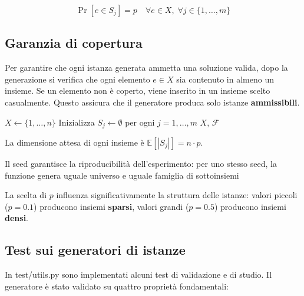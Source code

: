 \documentclass[12pt, a4paper]{article}
\begin{document}
$$\Pr[e \in S_j] = p \quad \forall e \in X, \; \forall j \in \{1, \ldots, m\}$$

\subsection*{Garanzia di copertura}

Per garantire che ogni istanza generata ammetta una soluzione valida, 
dopo la generazione si verifica che ogni elemento $e \in X$ 
sia contenuto in almeno un insieme. Se un elemento non è coperto, 
viene inserito in un insieme scelto casualmente. 
Questo assicura che il generatore produca solo istanze \textbf{ammissibili}.


\begin{algorithm}[H]
\caption{Generatore istanze - pseudocodice}
\KwIn{$n, m \in \mathbb{N}$, $p \in (0,1]$}
$X \leftarrow \{1, \ldots, n\}$\;
Inizializza $S_j \leftarrow \emptyset$ per ogni $j = 1, \ldots, m$\;
\Return $X$, $\mathcal{F}$\;
\end{algorithm}


La dimensione attesa di ogni insieme è $\mathbb{E}[|S_j|] = n \cdot p$.

Il seed garantisce la riproducibilità dell'esperimento: per uno stesso seed, 
la funzione genera uguale universo e uguale famiglia di sottoinsiemi

La scelta di $p$ influenza significativamente la struttura delle istanze:
valori piccoli ($p = 0.1$) producono insiemi \textbf{sparsi}, 
valori grandi ($p = 0.5$) producono insiemi \textbf{densi}.

\subsection*{Test sui generatori di istanze}
In test/utils.py sono implementati alcuni test di validazione e di studio.
Il generatore è stato validato su quattro proprietà fondamentali:
\end{document}
